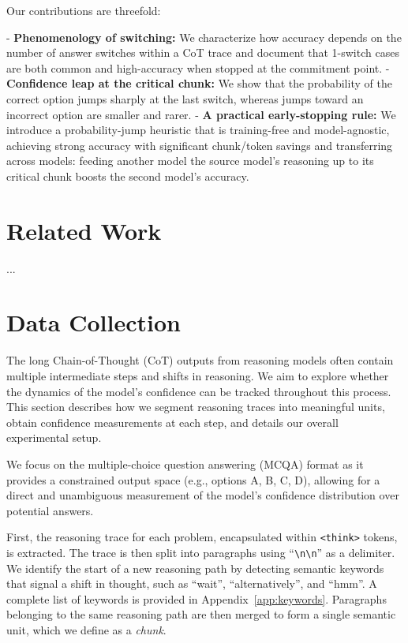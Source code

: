 \documentclass{article}
\begin{document}
Our contributions are threefold:

- \textbf{Phenomenology of switching:} We characterize how accuracy depends on the number of answer switches within a CoT trace and document that 1-switch cases are both common and high-accuracy when stopped at the commitment point.
- \textbf{Confidence leap at the critical chunk:} We show that the probability of the correct option jumps sharply at the last switch, whereas jumps toward an incorrect option are smaller and rarer.
- \textbf{A practical early-stopping rule:} We introduce a probability-jump heuristic that is training-free and model-agnostic, achieving strong accuracy with significant chunk/token savings and transferring across models: feeding another model the source model’s reasoning up to its critical chunk boosts the second model’s accuracy.

\section{Related Work}
\label{sec:related_work}

...

\section{Data Collection}
\label{sec:data_collection}
The long Chain-of-Thought (CoT) outputs from reasoning models often contain multiple intermediate steps and shifts in reasoning. We aim to explore whether the dynamics of the model's confidence can be tracked throughout this process. This section describes how we segment reasoning traces into meaningful units, obtain confidence measurements at each step, and details our overall experimental setup.

We focus on the multiple-choice question answering (MCQA) format as it provides a constrained output space (e.g., options A, B, C, D), allowing for a direct and unambiguous measurement of the model's confidence distribution over potential answers.

First, the reasoning trace for each problem, encapsulated within \texttt{<think>} tokens, is extracted. The trace is then split into paragraphs using ``\verb|\n\n|'' as a delimiter. We identify the start of a new reasoning path by detecting semantic keywords that signal a shift in thought, such as ``wait'', ``alternatively'', and ``hmm''. A complete list of keywords is provided in Appendix~\ref{app:keywords}. Paragraphs belonging to the same reasoning path are then merged to form a single semantic unit, which we define as a \textit{chunk}.
\end{document}

